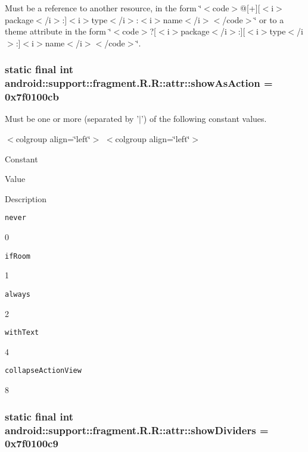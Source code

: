 Must be a reference to another resource, in the form \char`\"{}$<$code$>$@\mbox{[}+\mbox{]}\mbox{[}$<$i$>$package$<$/i$>$:\mbox{]}$<$i$>$type$<$/i$>$:$<$i$>$name$<$/i$>$$<$/code$>$\char`\"{} or to a theme attribute in the form \char`\"{}$<$code$>$?\mbox{[}$<$i$>$package$<$/i$>$:\mbox{]}\mbox{[}$<$i$>$type$<$/i$>$:\mbox{]}$<$i$>$name$<$/i$>$$<$/code$>$\char`\"{}. \hypertarget{classandroid_1_1support_1_1fragment_1_1_r_1_1attr_a3f415aa2f53ee5da653c366e38d1471}{
\subsubsection[{showAsAction}]{\setlength{\rightskip}{0pt plus 5cm}static final int android::support::fragment.R.R::attr::showAsAction = 0x7f0100cb}}
\label{classandroid_1_1support_1_1fragment_1_1_r_1_1attr_a3f415aa2f53ee5da653c366e38d1471}


Must be one or more (separated by '$|$') of the following constant values. \begin{TabularC}{0}
\hline
\end{TabularC}
$<$colgroup align=\char`\"{}left\char`\"{}$>$ $<$colgroup align=\char`\"{}left\char`\"{}$>$ 

Constant

Value

Description 

{\tt never}

0

{\tt ifRoom}

1

{\tt always}

2

{\tt withText}

4

{\tt collapseActionView}

8\hypertarget{classandroid_1_1support_1_1fragment_1_1_r_1_1attr_138ed19be88d96bcf1baccb01aff7cfa}{
\subsubsection[{showDividers}]{\setlength{\rightskip}{0pt plus 5cm}static final int android::support::fragment.R.R::attr::showDividers = 0x7f0100c9}}
\label{classandroid_1_1support_1_1fragment_1_1_r_1_1attr_138ed19be88d96bcf1baccb01aff7cfa}


